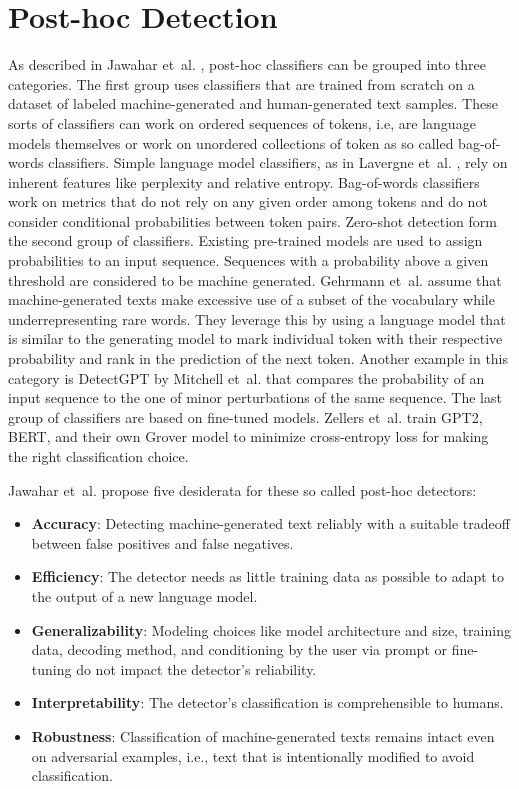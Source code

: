    \chapter{Post-hoc Detection}
    \label{chap:posthoc}
    As described in Jawahar et~al. \cite{jawahar2020automatic}, post-hoc classifiers can be grouped into three categories.
    The first group uses classifiers that are trained from scratch on a dataset of labeled machine-generated and human-generated text samples.
    These sorts of classifiers can work on ordered sequences of tokens, i.e, are language models themselves or work on unordered collections of token as so called bag-of-words classifiers.
    Simple language model classifiers, as in Lavergne et~al. \cite{lavergne2008detecting}, rely on inherent features like perplexity and relative entropy.
    Bag-of-words classifiers work on metrics that do not rely on any given order among tokens and do not consider conditional probabilities between token pairs.
    Zero-shot detection form the second group of classifiers.
    Existing pre-trained models are used to assign probabilities to an input sequence.
    Sequences with a probability above a given threshold are considered to be machine generated.
    Gehrmann et~al. \cite{gehrmann2019gltr} assume that machine-generated texts make excessive use of a subset of the vocabulary while underrepresenting rare words.
    They leverage this by using a language model that is similar to the generating model to mark individual token with their respective probability and rank in the prediction of the next token.
    Another example in this category is DetectGPT by Mitchell et~al. \cite{mitchell2023detectgpt} that compares the probability of an input sequence to the one of minor perturbations of the same sequence.        
    The last group of classifiers are based on fine-tuned models.
    Zellers et~al. \cite{zellers2020defending} train GPT2, BERT, and their own Grover model to minimize cross-entropy loss for making the right classification choice.
    
    Jawahar et~al. \cite{jawahar2020automatic} propose five desiderata for these so called post-hoc detectors:
    \begin{itemize}
        \item \textbf{Accuracy}: Detecting machine-generated text reliably with a suitable tradeoff between false positives and false negatives.
        \item \textbf{Efficiency}: The detector needs as little training data as possible to adapt to the output of a new language model.
        \item \textbf{Generalizability}: Modeling choices like model architecture and size, training data, decoding method, and conditioning by the user via prompt or fine-tuning do not impact the detector's reliability.
        \item \textbf{Interpretability}: The detector's classification is comprehensible to humans.
        \item \textbf{Robustness}: Classification of machine-generated texts remains intact even on adversarial examples, i.e., text that is intentionally modified to avoid classification. 
    \end{itemize}

